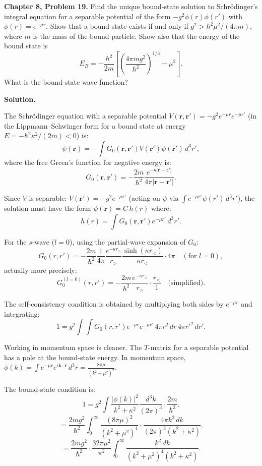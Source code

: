 \documentclass[12pt]{article}
\begin{document}
\textbf{Chapter 8, Problem 19.} Find the unique bound-state solution to Schr\"odinger's integral equation for a separable potential of the form $-g^2\phi(r)\phi(r')$ with $\phi(r) = e^{-\mu r}$. Show that a bound state exists if and only if $g^2 > \hbar^2\mu^2/(4\pi m)$, where $m$ is the mass of the bound particle. Show also that the energy of the bound state is
\[
E_B = -\frac{\hbar^2}{2m}\left[\left(\frac{4\pi m g^2}{\hbar^2}\right)^{1/3}-\mu^2\right].
\]
What is the bound-state wave function?

\bigskip
\textbf{Solution.}

The Schr\"odinger equation with a separable potential $V(\mathbf{r},\mathbf{r}') = -g^2 e^{-\mu r}e^{-\mu r'}$ (in the Lippmann--Schwinger form for a bound state at energy $E=-\hbar^2\kappa^2/(2m) < 0$) is:
\[
\psi(\mathbf{r}) = -\int G_0(\mathbf{r},\mathbf{r}')V(\mathbf{r}')\psi(\mathbf{r}')\,d^3r',
\]
where the free Green's function for negative energy is:
\[
G_0(\mathbf{r},\mathbf{r}') = -\frac{2m}{\hbar^2}\frac{e^{-\kappa|\mathbf{r}-\mathbf{r}'|}}{4\pi|\mathbf{r}-\mathbf{r}'|}.
\]

Since $V$ is separable: $V(\mathbf{r}') = -g^2 e^{-\mu r'}$ (acting on $\psi$ via $\int e^{-\mu r'}\psi(r')\,d^3r'$), the solution must have the form $\psi(\mathbf{r}) = C\,h(r)$ where:
\[
h(r) = \int G_0(\mathbf{r},\mathbf{r}')e^{-\mu r'}\,d^3r'.
\]

For the $s$-wave ($l=0$), using the partial-wave expansion of $G_0$:
\[
G_0(r,r') = -\frac{2m}{\hbar^2}\frac{1}{4\pi}\frac{e^{-\kappa r_>}}{r_>}\frac{\sinh(\kappa r_<)}{\kappa r_<}\cdot 4\pi \quad(\text{for }l=0),
\]
actually more precisely:
\[
G_0^{(l=0)}(r,r') = -\frac{2m}{\hbar^2}\frac{e^{-\kappa r_>}}{r_>}\cdot\frac{r_<}{1}\quad\text{(simplified)}.
\]

The self-consistency condition is obtained by multiplying both sides by $e^{-\mu r}$ and integrating:
\[
1 = g^2\int\!\!\int G_0(r,r')e^{-\mu r}e^{-\mu r'}\,4\pi r^2\,dr\,4\pi r'^2\,dr'.
\]

Working in momentum space is cleaner. The $T$-matrix for a separable potential has a pole at the bound-state energy. In momentum space, $\phi(k) = \int e^{-\mu r}e^{i\mathbf{k}\cdot\mathbf{r}}\,d^3r = \frac{8\pi\mu}{(k^2+\mu^2)^2}$.

The bound-state condition is:
\[
1 = g^2\int\frac{|\phi(k)|^2}{k^2+\kappa^2}\frac{d^3k}{(2\pi)^3}\cdot\frac{2m}{\hbar^2}.
\]
\[
= \frac{2mg^2}{\hbar^2}\int_0^\infty \frac{(8\pi\mu)^2}{(k^2+\mu^2)^4}\cdot\frac{4\pi k^2\,dk}{(2\pi)^3(k^2+\kappa^2)}.
\]
\[
= \frac{2mg^2}{\hbar^2}\cdot\frac{32\pi\mu^2}{\pi^2}\int_0^\infty\frac{k^2\,dk}{(k^2+\mu^2)^4(k^2+\kappa^2)}.
\]
\end{document}
